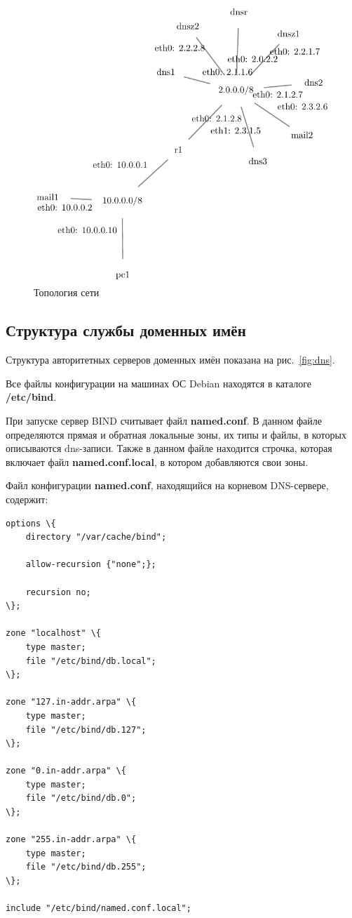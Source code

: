 \documentclass[a4paper,12pt]{article}
\begin{document}
\begin{figure}
\centering
\includegraphics[width=\textwidth]{includes/network_gv.pdf}
\caption{Топология сети}
\label{fig:network}
\end{figure}

\subsection{Структура службы доменных имён}

Структура авторитетных серверов доменных имён показана на рис.~\ref{fig:dns}. 

Все файлы конфигурации на машинах ОС Debian находятся в каталоге \textbf{/etc/bind}.

При запуске сервер BIND считывает файл \textbf{named.conf}. В данном файле определяются прямая и обратная локальные зоны, их типы и файлы, в которых описываются dns-записи. Также в данном файле находится строчка, которая включает файл \textbf{named.conf.local}, в котором добавляются свои зоны.

Файл конфигурации \textbf{named.conf}, находящийся на корневом DNS-сервере, содержит:
\begin{verbatim}
options \{
    directory "/var/cache/bind";

    allow-recursion {"none";};

    recursion no;
\};

zone "localhost" \{
    type master;
    file "/etc/bind/db.local";
\};

zone "127.in-addr.arpa" \{
    type master;
    file "/etc/bind/db.127";
\};

zone "0.in-addr.arpa" \{
    type master;
    file "/etc/bind/db.0";
\};

zone "255.in-addr.arpa" \{
    type master;
    file "/etc/bind/db.255";
\};

include "/etc/bind/named.conf.local";
\end{verbatim}
\end{document}
